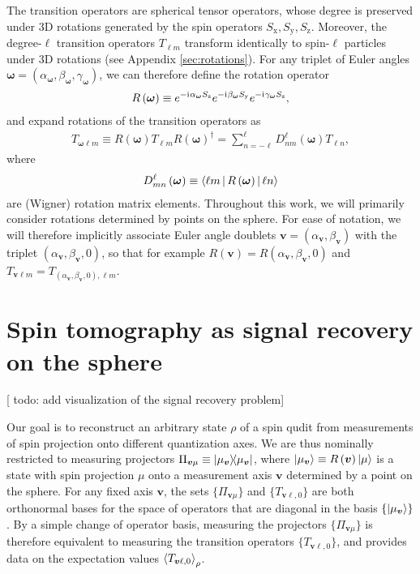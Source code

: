 \documentclass[notitlepage,twocolumn]{revtex4-2}
\newcommand{\p}[1]{\left(#1\right)} %
\newcommand{\bk}{\Braket} %
\renewcommand{\v}{\bm} %
\renewcommand{\i}{\mathrm{i}\mkern1mu} %
\renewcommand{\set}[1]{\{#1\}} %
\newcommand{\x}{\text{x}}
\newcommand{\y}{\text{y}}
\newcommand{\z}{\text{z}}
\newcommand{\1}{\mathds{1}}
\newcommand{\red}[1]{{\color{red} #1}}
\begin{document}
The transition operators are spherical tensor operators, whose degree is preserved under 3D rotations generated by the spin operators $S_\x,S_\y,S_\z$.
Moreover, the degree-$\ell$ transition operators $T_{\ell m}$ transform identically to spin-$\ell$ particles under 3D rotations (see Appendix \ref{sec:rotations}).
For any triplet of Euler angles $\v\omega=\p{\alpha_{\v\omega},\beta_{\v\omega},\gamma_{\v\omega}}$, we can therefore define the rotation operator
\begin{align}
  R\p{\v\omega} \equiv e^{-\i\alpha_{\v\omega}S_\z} e^{-\i\beta_{\v\omega}S_\y} e^{-\i\gamma_{\v\omega}S_\z},
\end{align}
and expand rotations of the transition operators as
\begin{align}
  T_{\v\omega\ell m} \equiv
  R\p{\v\omega} T_{\ell m} R\p{\v\omega}^\dag
  = \sum_{n=-\ell}^\ell D_{nm}^\ell\p{\v\omega} T_{\ell n},
  \label{eq:trans_rot}
\end{align}
where
\begin{align}
  D_{mn}^\ell\p{\v\omega} \equiv \bk{\ell m|R\p{\v\omega}|\ell n}
\end{align}
are (Wigner) rotation matrix elements.
Throughout this work, we will primarily consider rotations determined by points on the sphere.
For ease of notation, we will therefore implicitly associate Euler angle doublets $\v v=\p{\alpha_{\v v},\beta_{\v v}}$ with the triplet $\p{\alpha_{\v v},\beta_{\v v},0}$, so that for example $R\p{\v v} = R\p{\alpha_{\v v},\beta_{\v v},0}$ and $T_{\v v\ell m} = T_{\p{\alpha_{\v v},\beta_{\v v},0},\ell m}$.

\section{Spin tomography as signal recovery on the sphere}
\label{sec:signal_recovery}

[\red{todo: add visualization of the signal recovery problem}]

Our goal is to reconstruct an arbitrary state $\rho$ of a spin qudit from measurements of spin projection onto different quantization axes.
We are thus nominally restricted to measuring projectors $\Pi_{\v v\mu} \equiv \op{\mu_{\v v}}$, where $\ket{\mu_{\v v}}\equiv R\p{\v v}\ket{\mu}$ is a state with spin projection $\mu$ onto a measurement axis $\v v$ determined by a point on the sphere.
For any fixed axis $\v v$, the sets $\set{\Pi_{\v v\mu}}$ and $\set{T_{\v v\ell,0}}$ are both orthonormal bases for the space of operators that are diagonal in the basis $\set{\ket{\mu_{\v v}}}$.
By a simple change of operator basis, measuring the projectors $\set{\Pi_{\v v\mu}}$ is therefore equivalent to measuring the transition operators $\set{T_{\v v\ell,0}}$, and provides data on the expectation values $\bk{T_{\v v\ell,0}}_\rho$.
\end{document}
